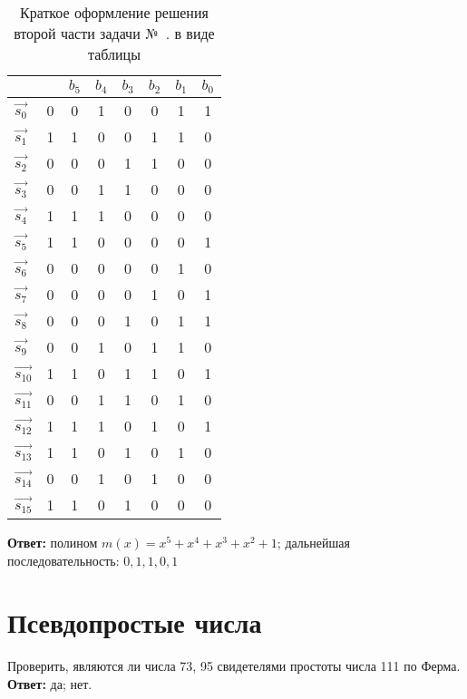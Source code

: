 \begin{itemize}
\begin{table}[!thb]
\begin{tabular}{ l | c || c c c c c|| c }
		 & & $b_{5}$& $b_{4}$& $b_{3}$& $b_{2}$& $b_{1}$ & $b_0$ \\
		  \hline
		  $\overrightarrow {s_{0}}$ & 0 & 0 & 1 & 0 & 0 & 1& 1 \\
		  \hline
		  $\overrightarrow {s_{1}}$ & 1 & 1 & 0 & 0 & 1 & 1& 0 \\
		  $\overrightarrow {s_{2}}$ & 0 & 0 & 0 & 1 & 1 & 0& 0 \\
		  $\overrightarrow {s_{3}}$ & 0 & 0 & 1 & 1 & 0 & 0& 0 \\
		  $\overrightarrow {s_{4}}$ & 1 & 1 & 1 & 0 & 0 & 0& 0 \\
		  $\overrightarrow {s_{5}}$ & 1 & 1 & 0 & 0 & 0 & 0& 1 \\
		  \hline
		  $\overrightarrow {s_{6}}$ & 0 & 0 & 0 & 0 & 0 & 1& 0 \\
		  $\overrightarrow {s_{7}}$ & 0 & 0 & 0 & 0 & 1 & 0& 1 \\
		  $\overrightarrow {s_{8}}$ & 0 & 0 & 0 & 1 & 0 & 1& 1 \\
		  $\overrightarrow {s_{9}}$ & 0 & 0 & 1 & 0 & 1 & 1& 0 \\
		  $\overrightarrow {s_{10}}$ & 1 & 1 & 0 & 1 & 1 & 0& 1 \\
		  \hline
		  $\overrightarrow {s_{11}}$ & 0 & 0 & 1 & 1 & 0 & 1& 0 \\
		  $\overrightarrow {s_{12}}$ & 1 & 1 & 1 & 0 & 1 & 0& 1 \\
		  $\overrightarrow {s_{13}}$ & 1 & 1 & 0 & 1 & 0 & 1& 0 \\
		  $\overrightarrow {s_{14}}$ & 0 & 0 & 1 & 0 & 1 & 0& 0 \\
		  $\overrightarrow {s_{15}}$ & 1 & 1 & 0 & 1 & 0 & 0& 0 \\
		\hline
		\end{tabular}
		\caption{Краткое оформление решения второй части задачи №~. в виде таблицы}
		\label{table:task-lfsr-2-short-solution}
	\end{table}
\end{itemize}
\medbreak
\textbf{Ответ:} полином $m \left( x \right) = x^{5} + x^{4} + x^{3} + x^{2} + 1$; дальнейшая последовательность: $0,1,1,0,1$

\section{Псевдопростые числа}
\tasksection

\tasknumber Проверить, являются ли числа 73, 95 свидетелями простоты числа 111 по Ферма.
\medbreak
\textbf{Ответ:} да; нет.
\bigbreak


